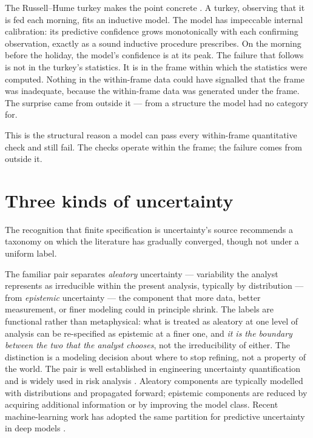 \documentclass[11pt,a4paper]{article}
\begin{document}
The Russell--Hume turkey makes the point concrete
\citep{Russell1912,Hume1748,Taleb2007}. A turkey, observing that it is fed
each morning, fits an inductive model. The model has impeccable internal
calibration: its predictive confidence grows monotonically with each
confirming observation, exactly as a sound inductive procedure
prescribes. On the morning before the holiday, the model's confidence is
at its peak. The failure that follows is not in the turkey's statistics.
It is in the frame within which the statistics were computed. Nothing in
the within-frame data could have signalled that the frame was inadequate,
because the within-frame data was generated under the frame. The surprise
came from outside it --- from a structure the model had no category for.

This is the structural reason a model can pass every within-frame
quantitative check and still fail. The checks operate within the frame;
the failure comes from outside it.

\section{Three kinds of uncertainty}
\label{sec:three}

The recognition that finite specification is uncertainty's source
recommends a taxonomy on which the literature has gradually converged,
though not under a uniform label.

The familiar pair separates \emph{aleatory} uncertainty --- variability
the analyst represents as irreducible within the present analysis,
typically by distribution --- from \emph{epistemic} uncertainty --- the
component that more data, better measurement, or finer modeling could in
principle shrink. The labels are functional rather than metaphysical:
what is treated as aleatory at one level of analysis can be re-specified
as epistemic at a finer one, and \emph{it is the boundary between the two
that the analyst chooses}, not the irreducibility of either. The
distinction is a modeling decision about where to stop refining, not a
property of the world. The pair is well established in engineering
uncertainty quantification
\citep{HeltonOberkampf2004,OberkampfRoy2010} and is widely used in risk
analysis \citep{MorganHenrion1990}. Aleatory components are typically
modelled with distributions and propagated forward; epistemic components
are reduced by acquiring additional information or by improving the
model class. Recent machine-learning work has adopted the same partition
for predictive uncertainty in deep models
\citep{KendallGal2017,HullermeierWaegeman2021}.
\end{document}

